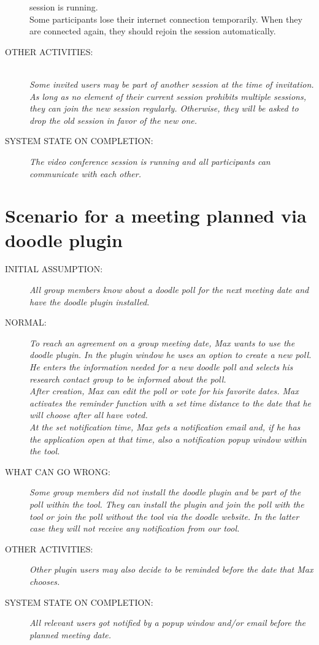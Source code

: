 \begin{description}
{session is running.
\\Some participants lose their internet connection temporarily.
When they are connected again, they should rejoin the session automatically.}
\item[OTHER ACTIVITIES:]
\textit{\\Some invited users may be part of another session at the time of invitation.
As long as no element of their current session prohibits multiple sessions,
they can join the new session regularly. Otherwise, they will be asked to drop
the old session in favor of the new one.}
\item[SYSTEM STATE ON COMPLETION:]
\textit{The video conference session is running and all participants can
communicate with each other.}
\end{description}

\section{Scenario for a meeting planned via doodle plugin}
\begin{description}
\item[INITIAL ASSUMPTION:]
\textit{All group members know about a doodle poll for the next meeting date and
have the doodle plugin installed.}
\item[NORMAL:]
\textit{To reach an agreement on a group meeting date, Max wants to use the
doodle plugin. In the plugin window he uses an option to create a new poll. He
enters the information needed for a new doodle poll and selects his research
contact group to be informed about the poll.
\\After creation, Max can edit the poll or vote for his favorite dates. Max
activates the reminder function with a set time distance to the date that he
will choose after all have voted.
\\At the set notification time, Max gets a notification email and, if he
has the application open at that time, also a notification popup window within
the tool.}
\item[WHAT CAN GO WRONG:]
\textit{Some group members did not install the doodle plugin and be part of the
poll within the tool. They can install the plugin and join the poll with the
tool or join the poll without the tool via the doodle website. In the latter
case they will not receive any notification from our tool.}
\item[OTHER ACTIVITIES:]
\textit{Other plugin users may also decide to be reminded before the date that
Max chooses.}
\item[SYSTEM STATE ON COMPLETION:]
\textit{All relevant users got notified by a popup window and/or email before
the planned meeting date.}
\end{description}


